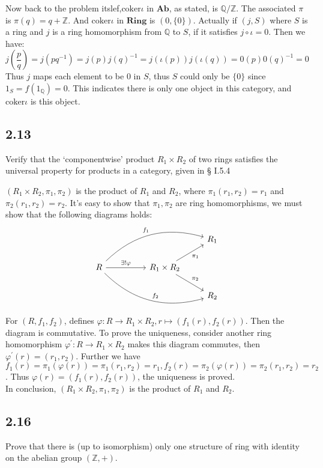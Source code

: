\documentclass[a4paper, pdf, 12pt]{article}
\makeatletter
\renewenvironment{proof}[1][\proofname]{\par
  \pushQED{\qed}%
  \normalfont \topsep6\p@\@plus6\p@\relax
  \trivlist
  \item[%
    \hskip\labelsep
    \normalfont\bfseries %
    #1%
    \@addpunct{.}%
  ]\ignorespaces
}{%
  \popQED\endtrivlist\@endpefalse
}
\let\qed\relax %
\DeclareRobustCommand{\qed}{%
  \ifmmode \mathqed
  \else
    \leavevmode\unskip\penalty\@M\hbox{}\nobreak\hspace{.5em minus .1em}%
    \hbox{\qedsymbol}%
  \fi
}
\makeatother
\begin{document}
\begin{proof}
  Now back to the problem itslef,$\mbox{coker}\iota$ in $\mathbf{Ab}$, as stated, is $\mathbb{Q}/\mathbb{Z}$. The associated $\pi$ is $\pi(q) = q+\mathbb{Z}$. 
  And $\mbox{coker}\iota$ in $\mathbf{Ring}$ is $(0, \{0\})$. Actually if $(j, S)$ where $S$ is a ring  and $j$ is a ring homomorphism from $\mathbb{Q}$ to $S$, 
  if it satisfies $j\circ \iota = 0$. Then we have:
  $$
  j(\frac{p}{q}) = j(pq^{-1}) = j(p)j(q)^{-1}=j(\iota(p))j(\iota(q))=0(p)0(q)^{-1}=0
  $$
  Thus $j$ maps each element to be 0 in $S$, thus $S$ could only be $\{0\}$ since $1_{S}=f(1_{\mathbb{Q}})=0$. This indicates there is only one object in this category,
  and $\mbox{coker}\iota$ is this object.
\end{proof}
\subsection*{2.13}
Verify that the ‘componentwise’ product $R_1\times R_2$ of two rings satisﬁes the universal property for products in a category, given in § I.5.4
\begin{proof}
  $(R_1\times R_2, \pi_1, \pi_2)$ is the product of $R_1$ and $R_2$, where $\pi_1(r_1,r_2)=r_1$ and $\pi_2(r_1, r_2)=r_2$. It's easy to show that $\pi_1, \pi_2$ are 
  ring homomorphisms, we must show that the following diagrams holds:
  $$
\begin{tikzcd}
  &  &                                                        & R_1 \\
R \arrow[rr, "\exists!\varphi"] \arrow[rrru, "f_1", bend left] \arrow[rrrd, "f_2", bend right] &  & R_1\times R_2 \arrow[ru, "\pi_1"'] \arrow[rd, "\pi_2"] &     \\
  &  &                                                        & R_2
\end{tikzcd}
$$
For $(R, f_1, f_2)$, defines $\varphi: R\rightarrow R_1\times R_2, r\mapsto(f_1(r), f_2(r))$. Then the diagram is commutative. To prove the uniqueness, 
consider another ring homomorphism $\varphi^{'}:R\rightarrow R_1\times R_2$ makes this diagram commutes, then $\varphi^{'}(r)=(r_1, r_2)$. Further we have $f_1(r) = \pi_1(\varphi(r)) = \pi_1(r_1, r_2)=r_1, f_2(r)=\pi_2(\varphi(r)) = \pi_2(r_1,r_2) = r_2$. 
Thus $\varphi(r) = (f_1(r), f_2(r))$, the uniqueness is proved.\\

In conclusion, $(R_1\times R_2, \pi_1, \pi_2)$ is the product of $R_1$ and $R_2$.
\end{proof}
\subsection*{2.16}
Prove that there is (up to isomorphism) only one structure of ring with identity on the abelian group $(\mathbb{Z}, +)$.
\end{document}
